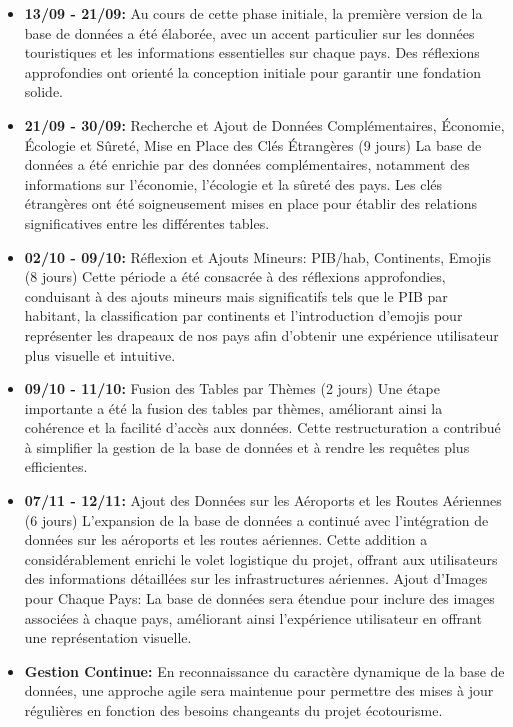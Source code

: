 \documentclass[mstat,12pt]{unswthesis}
\begin{document}
\begin{adjustwidth}{-2cm}{}
\begin{itemize}
\tightlist
\item
  \textbf{13/09 - 21/09:} Au cours de cette phase initiale, la première
  version de la base de données a été élaborée, avec un accent
  particulier sur les données touristiques et les informations
  essentielles sur chaque pays. Des réflexions approfondies ont orienté
  la conception initiale pour garantir une fondation solide.
\item
  \textbf{21/09 - 30/09:} Recherche et Ajout de Données Complémentaires,
  Économie, Écologie et Sûreté, Mise en Place des Clés Étrangères (9
  jours) La base de données a été enrichie par des données
  complémentaires, notamment des informations sur l'économie, l'écologie
  et la sûreté des pays. Les clés étrangères ont été soigneusement mises
  en place pour établir des relations significatives entre les
  différentes tables.
\item
  \textbf{02/10 - 09/10:} Réflexion et Ajouts Mineurs: PIB/hab,
  Continents, Emojis (8 jours) Cette période a été consacrée à des
  réflexions approfondies, conduisant à des ajouts mineurs mais
  significatifs tels que le PIB par habitant, la classification par
  continents et l'introduction d'emojis pour représenter les drapeaux de
  nos pays afin d'obtenir une expérience utilisateur plus visuelle et
  intuitive.
\item
  \textbf{09/10 - 11/10:} Fusion des Tables par Thèmes (2 jours) Une
  étape importante a été la fusion des tables par thèmes, améliorant
  ainsi la cohérence et la facilité d'accès aux données. Cette
  restructuration a contribué à simplifier la gestion de la base de
  données et à rendre les requêtes plus efficientes.
\item
  \textbf{07/11 - 12/11:} Ajout des Données sur les Aéroports et les
  Routes Aériennes (6 jours) L'expansion de la base de données a
  continué avec l'intégration de données sur les aéroports et les routes
  aériennes. Cette addition a considérablement enrichi le volet
  logistique du projet, offrant aux utilisateurs des informations
  détaillées sur les infrastructures aériennes. Ajout d'Images pour
  Chaque Pays: La base de données sera étendue pour inclure des images
  associées à chaque pays, améliorant ainsi l'expérience utilisateur en
  offrant une représentation visuelle.
\item
  \textbf{Gestion Continue:} En reconnaissance du caractère dynamique de
  la base de données, une approche agile sera maintenue pour permettre
  des mises à jour régulières en fonction des besoins changeants du
  projet écotourisme.
\end{itemize}


\end{adjustwidth}
\end{document}
